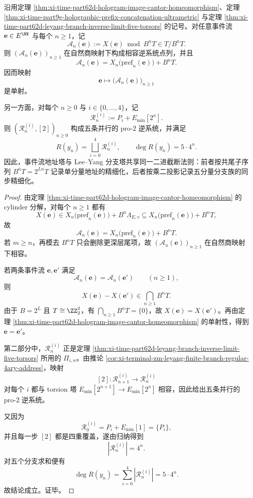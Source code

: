 \begin{theorem}\label{thm:xi-time-part62d-common-pro2-truncation-law}
沿用定理 \ref{thm:xi-time-part62d-hologram-image-cantor-homeomorphism}、定理 \ref{thm:xi-time-part9g-holographic-prefix-concatenation-ultrametric} 与定理 \ref{thm:xi-time-part62d-leyang-branch-inverse-limit-five-torsors} 的记号。对任意事件流 \(\mathbf e\in E^{\NN}\) 与每个 \(n\ge 1\)，记
\[
\mathcal A_n(\mathbf e):=X(\mathbf e)\bmod B^nT\in T/B^nT.
\]
则 \((\mathcal A_n(\mathbf e))_{n\ge 1}\) 在自然商映射下构成相容逆系统点列，并且
\[
\mathcal A_n(\mathbf e)=X_n\!\bigl(\mathrm{pref}_n(\mathbf e)\bigr)+B^nT.
\]
因而映射
\[
\mathbf e\longmapsto \bigl(\mathcal A_n(\mathbf e)\bigr)_{n\ge 1}
\]
是单射。

另一方面，对每个 \(n\ge 0\) 与 \(i\in\{0,\dots,4\}\)，记
\[
\mathcal R_n^{(i)}:=P_i+E_{\min}[2^n].
\]
则 \((\mathcal R_n^{(i)},[2])_{n\ge 0}\) 构成五条并行的 pro-\(2\) 逆系统，并满足
\[
R(y_n)=\bigsqcup_{i=0}^{4}\mathcal R_n^{(i)},
\qquad
\deg R(y_n)=5\cdot 4^n.
\]
因此，事件流地址塔与 Lee--Yang 分支塔共享同一二进截断法则：前者按共尾子序列 \(B^nT=2^{Ln}T\) 记录单分量地址的精细化，后者按乘二投影记录五分量分支族的同步精细化。
\end{theorem}
\begin{proof}
由定理 \ref{thm:xi-time-part62d-hologram-image-cantor-homeomorphism} 的 cylinder 分解，对每个 \(n\ge 1\) 都有
\[
X(\mathbf e)\in X_n\!\bigl(\mathrm{pref}_n(\mathbf e)\bigr)+B^n\Lambda_{E,v}\subseteq X_n\!\bigl(\mathrm{pref}_n(\mathbf e)\bigr)+B^nT,
\]
故
\[
\mathcal A_n(\mathbf e)=X_n\!\bigl(\mathrm{pref}_n(\mathbf e)\bigr)+B^nT.
\]
若 \(m\ge n\)，再模去 \(B^nT\) 只会删除更深层尾项，故 \((\mathcal A_n(\mathbf e))_{n\ge 1}\) 在自然商映射下相容。

若两条事件流 \(\mathbf e,\mathbf e'\) 满足
\[
\mathcal A_n(\mathbf e)=\mathcal A_n(\mathbf e')
\qquad (n\ge 1),
\]
则
\[
X(\mathbf e)-X(\mathbf e')\in \bigcap_{n\ge 1}B^nT.
\]
由于 \(B=2^L\) 且 \(T\cong \ZZ_2^2\)，有 \(\bigcap_{n\ge 1}B^nT=\{0\}\)，故 \(X(\mathbf e)=X(\mathbf e')\)。再由定理 \ref{thm:xi-time-part62d-hologram-image-cantor-homeomorphism} 的单射性，得到 \(\mathbf e=\mathbf e'\)。

第二部分中，\(\mathcal R_n^{(i)}\) 正是定理 \ref{thm:xi-time-part62d-leyang-branch-inverse-limit-five-torsors} 所用的 \(\Pi_{i,n}\)。由推论 \ref{cor:xi-terminal-zm-leyang-finite-branch-regular-4ary-address}，映射
\[
[2]:\mathcal R_{n+1}^{(i)}\longrightarrow \mathcal R_n^{(i)}
\]
对每个 \(i\) 都与 torsion 塔 \(E_{\min}[2^{n+1}]\to E_{\min}[2^n]\) 相容，因此给出五条并行的 pro-\(2\) 逆系统。

又因为
\[
\mathcal R_0^{(i)}=P_i+E_{\min}[1]=\{P_i\},
\]
并且每一步 \([2]\) 都是四重覆盖，遂由归纳得到
\[
|\mathcal R_n^{(i)}|=4^n.
\]
对五个分支求和便有
\[
\deg R(y_n)=\sum_{i=0}^{4}|\mathcal R_n^{(i)}|=5\cdot 4^n.
\]
故结论成立。证毕。
\end{proof}

